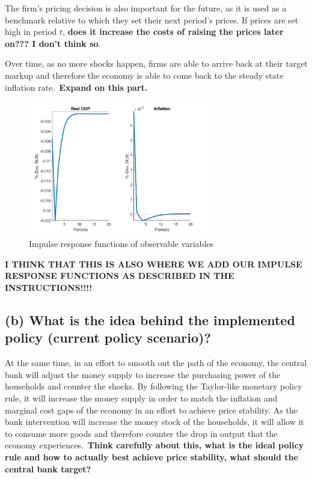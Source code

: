 \documentclass[12pt]{article}
\begin{document}
The firm's pricing decision is also important for the future, as it is used as a benchmark relative to which they set their next period's prices. If prices are set high in period $t$, \textbf{does it increase the costs of raising the prices later on??? I don't think so}.

Over time, as no more shocks happen, firms are able to arrive back at their target markup and therefore the economy is able to come back to the steady state inflation rate.\ \textbf{Expand on this part.}

\begin{figure}
    \caption{Impulse response functions of observable variables}\label{fig:obs_var_taylor}
    \centering
    \includegraphics[width=0.7\textwidth]{../matlab_base/output/irf_gdp_taylor.png}
\end{figure}

\textbf{I THINK THAT THIS IS ALSO WHERE WE ADD OUR IMPULSE RESPONSE FUNCTIONS AS DESCRIBED IN THE INSTRUCTIONS!!!!}

\subsection*{(b) What is the idea behind the implemented policy (current policy scenario)?}

At the same time, in an effort to smooth out the path of the economy, the central bank will adjust the money supply to increase the purchasing power of the households and counter the shocks. By following the Taylor-like monetary policy rule, it will increase the money supply in order to match the inflation and marginal cost gaps of the economy in an effort to achieve price stability. As the bank intervention will increase the money stock of the households, it will allow it to consume more goods and therefore counter the drop in output that the economy experiences.\ \textbf{Think carefully about this, what is the ideal policy rule and how to actually best achieve price stability, what should the central bank target?}
\end{document}
